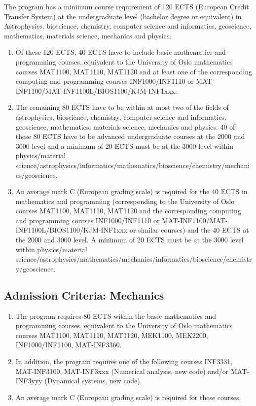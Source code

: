 \documentclass[%
oneside,                 %
final,                   %
10pt]{article}
\begin{document}
The program has a minimum course requirement of 120 ECTS (European Credit Transfer System) at the undergraduate level (bachelor degree or equivalent) in Astrophysics, bioscience, chemistry, computer science and informatics, geoscience, mathematics, materials science, mechanics and physics. 
\begin{enumerate}
\item Of these 120 ECTS, 40 ECTS have to include basic mathematics and programming courses, equivalent to the University of Oslo mathematics courses MAT1100, MAT1110, MAT1120 and at least one of the corresponding computing and programming courses INF1000/INF1110 or MAT-INF1100/MAT-INF1100L/BIOS1100/KJM-INF1xxx. 

\item The remaining 80 ECTS have to be within at most two of the fields of astrophysics, bioscience, chemistry, computer science and informatics, geoscience, mathematics, materials science, mechanics and physics. 40 of these 80 ECTS have to be advanced undergraduate courses at the 2000 and 3000 level and a minimum of 20 ECTS must be at the 3000 level within physics/material science/astrophysics/informatics/mathematics/bioscience/chemistry/mechanics/geoscience.

\item An average mark C (European grading scale) is required for the 40 ECTS in mathematics and programming (corresponding  to the University of Oslo courses  MAT1100, MAT1110, MAT1120  and the corresponding computing and programming courses INF1000/INF1110 or MAT-INF1100/MAT-INF1100L/BIOS1100/KJM-INF1xxx or similar courses) and the 40 ECTS at the 2000 and 3000 level. A minimum of 20 ECTS must be at the 3000 level within physics/material science/astrophysics/mathematics/mechanics/informatics/bioscience/chemistry/geoscience.
\end{enumerate}

\noindent
\subsection{Admission Criteria: Mechanics}

\begin{enumerate}
\item The program requires 80 ECTS within the  basic mathematics and programming courses, equivalent to the University of Oslo mathematics courses MAT1100, MAT1110, MAT1120, MEK1100, MEK2200, INF1000/INF1100, MAT-INF3360.

\item In addition, the program requires  one of the following courses INF3331, MAT-INF3100, MAT-INF3xxx (Numerical analysis, new code) and/or MAT-INF3yyy (Dynamical systems, new code). 

\item An average mark C (European grading scale) is required for these courses.
\end{enumerate}
\end{document}
